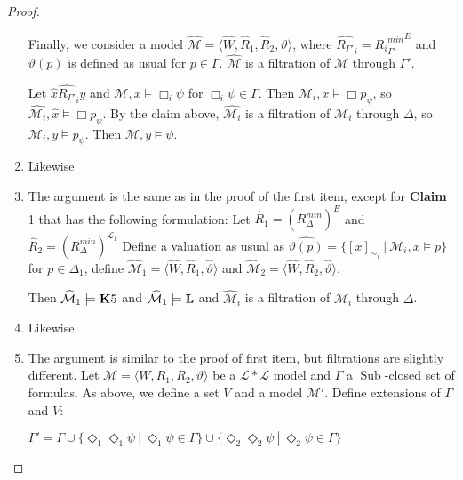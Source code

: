 \documentclass[a4paper]{article}
\theoremstyle{defin}
\theoremstyle{theorem}
\theoremstyle{prop}
\theoremstyle{lemma}
\theoremstyle{fact}
\theoremstyle{ex}
\theoremstyle{col}
\theoremstyle{claim}
\begin{document}
\begin{proof}
\begin{enumerate}
  Finally, we consider a model $\widehat{\mathcal{M}} = \langle \widehat{W}, \widehat{R}_1, \widehat{R}_2, \vartheta \rangle$, where $\widehat{R_{\Gamma'}}_i = {{R_i}^{min}_{\Gamma'}}^E$ and $\vartheta(p)$ is defined as usual for $p \in \Gamma$. $\widehat{\mathcal{M}}$ is a filtration of $\mathcal{M}$ through $\Gamma'$.

  Let $\hat{x} \widehat{R_{\Gamma'}}_i \hat{y}$ and $\mathcal{M}, x \models \Box_i \psi$ for $\Box_i \psi \in \Gamma$. Then $\mathcal{M}_i, x \models \Box p_{\psi}$, so $\widehat{\mathcal{M}_i}, \hat{x} \models \Box p_{\psi}$.
  By the claim above, $\widehat{\mathcal{M}_i}$ is a filtration of $\mathcal{M}_i$ through $\Delta$, so $\mathcal{M}_i, y \models p_{\psi}$. Then $\mathcal{M}, y \models \psi$.

  \item Likewise
  \item The argument is the same as in the proof of the first item, except for {\bf Claim} 1 that has the following formulation:
  Let $\widehat{R}_1 = (R^{min}_{\Delta})^{E}$ and $\widehat{R}_2 = (R^{min}_{\Delta})^{\mathcal{L}_1}$
  Define a valuation as usual as $\widehat{\vartheta(p)} = \{ [x]_{\sim_i} \: | \: \mathcal{M}_i, x \models p \}$ for $p \in \Delta_1$, define $\widehat{\mathcal{M}}_1 = \langle \widehat{W}, \widehat{R}_1, \widehat{\vartheta} \rangle$ and $\widehat{\mathcal{M}}_2 = \langle \widehat{W}, \widehat{R}_2, \widehat{\vartheta} \rangle$.

  Then $\widehat{\mathcal{M}}_1 \models {\bf K}5$ and $\widehat{\mathcal{M}}_1 \models {\bf L}$ and $\widehat{\mathcal{M}}_i$ is a filtration of $\mathcal{M}_i$ through $\Delta$.

  \item Likewise
  \item The argument is similar to the proof of first item, but filtrations are slightly different.
  Let $\mathcal{M} = \langle W, R_1, R_2, \vartheta \rangle$ be a $\mathcal{L} * \mathcal{L}$ model and $\Gamma$ a $\operatorname{Sub}$-closed set of formulas. As above, we define a set $V$ and a model $\mathcal{M}'$. Define extensions of $\Gamma$ and $V$:

  \begin{center}
    $\Gamma' = \Gamma \cup \{ \Diamond_1 \Diamond_1 \psi \: | \: \Diamond_1 \psi \in \Gamma \} \cup \{ \Diamond_2 \Diamond_2 \psi \: | \: \Diamond_2 \psi \in \Gamma \}$


\end{center}
\end{enumerate}
\end{proof}
\end{document}
